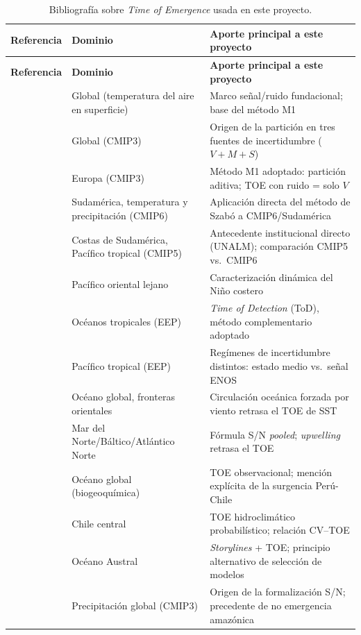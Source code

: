 \documentclass[11pt,a4paper]{article}
\begin{document}
\begin{longtable}{@{}L{3.6cm}L{3.0cm}L{\dimexpr\textwidth-3.6cm-3.0cm-4\tabcolsep\relax}@{}}
\caption{Bibliograf\'ia sobre \emph{Time of Emergence} usada en este proyecto.}
\label{tab:referencias} \\
\toprule
\textbf{Referencia} & \textbf{Dominio} & \textbf{Aporte principal a este proyecto} \\
\midrule
\endfirsthead
\toprule
\textbf{Referencia} & \textbf{Dominio} & \textbf{Aporte principal a este proyecto} \\
\midrule
\endhead
\citet{hawkins2012} & Global (temperatura del aire en superficie) & Marco se\~nal/ruido fundacional; base del m\'etodo M1 \\
\citet{hawkins2009,hawkins2011precip} & Global (CMIP3) & Origen de la partici\'on en tres fuentes de incertidumbre ($V+M+S$) \\
\citet{szabo2016} & Europa (CMIP3) & M\'etodo M1 adoptado: partici\'on aditiva; TOE con ruido = solo $V$ \\
\citet{bruno2023} & Sudam\'erica, temperatura y precipitaci\'on (CMIP6) & Aplicaci\'on directa del m\'etodo de Szab\'o a CMIP6/Sudam\'erica \\
\citet{alvarez2024} & Costas de Sudam\'erica, Pac\'ifico tropical (CMIP5) & Antecedente institucional directo (UNALM); comparaci\'on CMIP5 vs.\ CMIP6 \\
\citet{takahashi2019} & Pac\'ifico oriental lejano & Caracterizaci\'on din\'amica del Ni\~no costero \\
\citet{gopika2024} & Oc\'eanos tropicales (EEP) & \emph{Time of Detection} (ToD), m\'etodo complementario adoptado \\
\citet{zhong2023} & Pac\'ifico tropical (EEP) & Reg\'imenes de incertidumbre distintos: estado medio vs.\ se\~nal ENOS \\
\citet{larson2025} & Oc\'eano global, fronteras orientales & Circulaci\'on oce\'anica forzada por viento retrasa el TOE de SST \\
\citet{poul2025} & Mar del Norte\slash B\'altico\slash Atl\'antico Norte & F\'ormula S/N \emph{pooled}; \emph{upwelling} retrasa el TOE \\
\citet{keller2014} & Oc\'eano global (biogeoqu\'imica) & TOE observacional; menci\'on expl\'icita de la surgencia Per\'u-Chile \\
\citet{chadwick2019} & Chile central & TOE hidroclim\'atico probabil\'istico; relaci\'on CV--TOE \\
\citet{lois2026} & Oc\'eano Austral & \emph{Storylines} + TOE; principio alternativo de selecci\'on de modelos \\
\citet{giorgi2009} & Precipitaci\'on global (CMIP3) & Origen de la formalizaci\'on S/N; precedente de no emergencia amaz\'onica \\
\bottomrule
\end{longtable}
\end{document}
